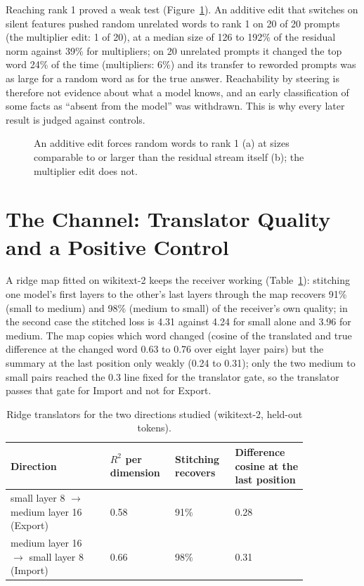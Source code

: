 Reaching rank 1 proved a weak test (Figure~\ref{fig:additive}). An additive edit that switches on silent features pushed random unrelated words to rank 1 on 20 of 20 prompts (the multiplier edit: 1 of 20), at a median size of 126 to 192\% of the residual norm against 39\% for multipliers; on 20 unrelated prompts it changed the top word 24\% of the time (multipliers: 6\%) and its transfer to reworded prompts was as large for a random word as for the true answer. Reachability by steering is therefore not evidence about what a model knows, and an early classification of some facts as ``absent from the model'' was withdrawn. This is why every later result is judged against controls.

\begin{figure}[t]
\centering
{}
\caption{An additive edit forces random words to rank 1 (a) at sizes comparable to or larger than the residual stream itself (b); the multiplier edit does not.}\label{fig:additive}
\end{figure}

\section{The Channel: Translator Quality and a Positive Control}\label{sec:channel}

A ridge map fitted on wikitext-2 keeps the receiver working (Table~\ref{tab:translator}): stitching one model's first layers to the other's last layers through the map recovers 91\% (small to medium) and 98\% (medium to small) of the receiver's own quality; in the second case the stitched loss is 4.31 against 4.24 for small alone and 3.96 for medium. The map copies which word changed (cosine of the translated and true difference at the changed word 0.63 to 0.76 over eight layer pairs) but the summary at the last position only weakly (0.24 to 0.31); only the two medium to small pairs reached the 0.3 line fixed for the translator gate, so the translator passes that gate for Import and not for Export.

\begin{table}[t]
\centering\small
\caption{Ridge translators for the two directions studied (wikitext-2, held-out tokens).}\label{tab:translator}
\begin{tabular}{|p{0.30\linewidth}|p{0.15\linewidth}|p{0.17\linewidth}|p{0.22\linewidth}|}
\hline
\textbf{Direction} & \textbf{$R^2$ per dimension} & \textbf{Stitching recovers} & \textbf{Difference cosine at the last position}\\ \hline
small layer 8 $\to$ medium layer 16 (Export) & 0.58 & 91\% & 0.28\\ \hline
medium layer 16 $\to$ small layer 8 (Import) & 0.66 & 98\% & 0.31\\ \hline
\end{tabular}
\end{table}

